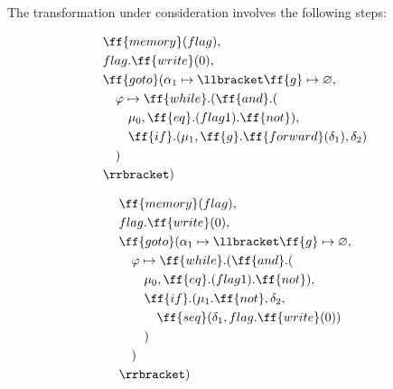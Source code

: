 \documentclass[sigplan,review,11pt,nonacm,natbib=false]{acmart}
\begin{document}
The transformation under consideration involves the following steps:


\begin{equation}
\begin{split}
& \ff{memory}(flag), \\
& flag.\ff{write}(0), \\
& \ff{goto} ( \alpha_1 \mapsto \llbracket \ff{g} \mapsto \varnothing, \\
& \quad \varphi \mapsto \ff{while}.(\ff{and}.( \\
& \quad \quad \mu_0, \ff{eq}.(flag  1).\ff{not}), \\
& \quad \quad \ff{if}.(\mu_1,  \ff{g}.\ff{forward}(\delta_1), \delta_2) \\
& \quad ) \\
& \rrbracket) \\
\end{split}
\end{equation}

\begin{equation}
\begin{split}
& \ff{memory}(flag), \\
& flag.\ff{write}(0), \\
& \ff{goto} ( \alpha_1 \mapsto \llbracket \ff{g} \mapsto \varnothing, \\
& \quad \varphi \mapsto \ff{while}.(\ff{and}.( \\
& \quad \quad \mu_0, \ff{eq}.(flag  1).\ff{not}), \\
& \quad \quad \ff{if}.(\mu_1.\ff{not}, \delta_2, \\
& \quad \quad \quad \ff{seq}( \delta_1, flag.\ff{write}(0) )\\
& \quad \quad ) \\
& \quad ) \\
& \rrbracket) \\
\end{split}
\end{equation}
\end{document}
